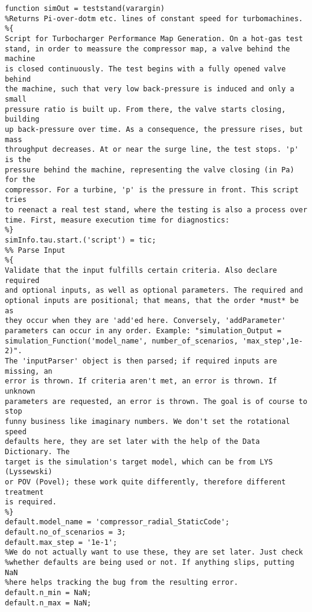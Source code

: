 \clearpage%
\begin{lstlisting}[caption = {[Test-stand function]Test-stand function, simulating a compressor or turbine on an actual, experimental test-stand as described in \cref{il:hot_gas,ch:test-stand}. For each rotational speed to be tested, one simulation is run in parallel. The function is mainly concerned with supplying and extracting data}, label={matlab:teststand}]
function simOut = teststand(varargin)
%Returns Pi-over-dotm etc. lines of constant speed for turbomachines.
%{
Script for Turbocharger Performance Map Generation. On a hot-gas test
stand, in order to meassure the compressor map, a valve behind the machine
is closed continuously. The test begins with a fully opened valve behind
the machine, such that very low back-pressure is induced and only a small
pressure ratio is built up. From there, the valve starts closing, building
up back-pressure over time. As a consequence, the pressure rises, but mass
throughput decreases. At or near the surge line, the test stops. 'p' is the
pressure behind the machine, representing the valve closing (in Pa) for the
compressor. For a turbine, 'p' is the pressure in front. This script tries
to reenact a real test stand, where the testing is also a process over
time. First, measure execution time for diagnostics:
%}
simInfo.tau.start.('script') = tic;
%% Parse Input
%{
Validate that the input fulfills certain criteria. Also declare required
and optional inputs, as well as optional parameters. The required and
optional inputs are positional; that means, that the order *must* be as
they occur when they are 'add'ed here. Conversely, 'addParameter'
parameters can occur in any order. Example: "simulation_Output =
simulation_Function('model_name', number_of_scenarios, 'max_step',1e-2)".
The 'inputParser' object is then parsed; if required inputs are missing, an
error is thrown. If criteria aren't met, an error is thrown. If unknown
parameters are requested, an error is thrown. The goal is of course to stop
funny business like imaginary numbers. We don't set the rotational speed
defaults here, they are set later with the help of the Data Dictionary. The
target is the simulation's target model, which can be from LYS (Lyssewski)
or POV (Povel); these work quite differently, therefore different treatment
is required.
%}
default.model_name = 'compressor_radial_StaticCode';
default.no_of_scenarios = 3;
default.max_step = '1e-1';
%We do not actually want to use these, they are set later. Just check
%whether defaults are being used or not. If anything slips, putting NaN
%here helps tracking the bug from the resulting error.
default.n_min = NaN;
default.n_max = NaN;


\end{lstlisting}
